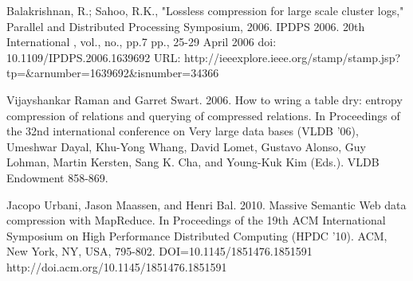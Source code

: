 \documentclass[twocolumn]{article}
\begin{document}
{\begin{thebibliography}{10}
	Balakrishnan, R.; Sahoo, R.K., "Lossless compression 
		for large scale cluster logs," Parallel and Distributed Processing 
		Symposium, 2006. IPDPS 2006. 20th International , vol., no., pp.7 pp., 
		25-29 April 2006 doi: 10.1109/IPDPS.2006.1639692
		URL: http://ieeexplore.ieee.org/stamp/stamp.jsp?tp=\&arnumber=1639692\&isnumber=34366

 Vijayshankar Raman and Garret Swart. 2006. How to 
		wring a table dry: entropy compression of relations and querying of 
		compressed relations. In Proceedings of the 32nd international conference 
		on Very large data bases (VLDB '06), Umeshwar Dayal, Khu-Yong Whang, 
		David Lomet, Gustavo Alonso, Guy Lohman, Martin Kersten, Sang K. Cha, 
		and Young-Kuk Kim (Eds.). VLDB Endowment 858-869.

 Jacopo Urbani, Jason Maassen, and Henri Bal. 2010. Massive 
		Semantic Web data compression with MapReduce. In Proceedings of the 19th 
		ACM International Symposium on High Performance Distributed Computing 
		(HPDC '10). ACM, New York, NY, USA, 795-802. DOI=10.1145/1851476.1851591 
	       	http://doi.acm.org/10.1145/1851476.1851591	


\end{thebibliography}
}
\end{document}
